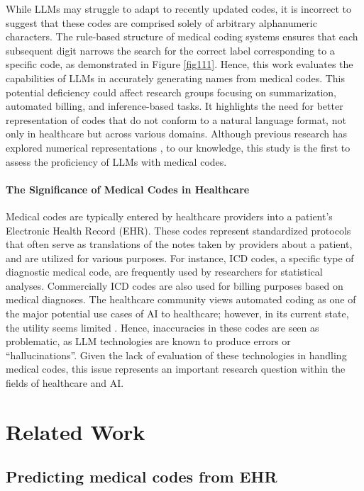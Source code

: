 \documentclass[11pt]{article}
\theoremstyle{plain}
\theoremstyle{definition}
\theoremstyle{remark}
\begin{document}
While LLMs may struggle to adapt to recently updated codes, it is incorrect to suggest that these codes are comprised solely of arbitrary alphanumeric characters. The rule-based structure of medical coding systems ensures that each subsequent digit narrows the search for the correct label corresponding to a specific code, as demonstrated in Figure \ref{fig111}. Hence, this work evaluates the capabilities of LLMs in accurately generating names from medical codes. This potential deficiency could affect research groups focusing on summarization, automated billing, and inference-based tasks. It highlights the need for better representation of codes that do not conform to a natural language format, not only in healthcare but across various domains. Although previous research has explored numerical representations \citep{golkar2023xval}, to our knowledge, this study is the first to assess the proficiency of LLMs with medical codes.

\paragraph{The Significance of Medical Codes in Healthcare}

Medical codes are typically entered by healthcare providers into a patient's Electronic Health Record (EHR). These codes represent standardized protocols that often serve as translations of the notes taken by providers about a patient, and are utilized for various purposes. For instance, ICD codes, a specific type of diagnostic medical code, are frequently used by researchers for statistical analyses. Commercially ICD codes are also used for billing purposes based on medical diagnoses. The healthcare community views automated coding as one of the major potential use cases of AI to healthcare; however, in its current state, the utility seems limited \cite{soroush2024large}. Hence, inaccuracies in these codes are seen as problematic, as LLM technologies are known to produce errors or ``hallucinations''. Given the lack of evaluation of these technologies in handling medical codes, this issue represents an important research question within the fields of healthcare and AI.

\section{Related Work}
\subsection{Predicting medical codes from EHR}
\end{document}
